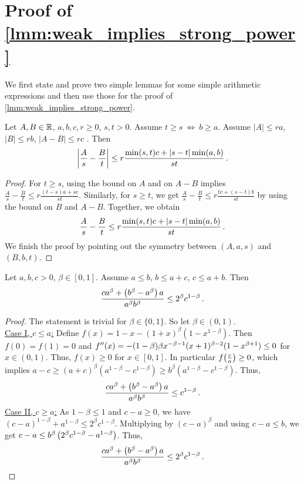 \section{Proof of \autoref{lmm:weak_implies_strong_power}} \label{app:power_metric_bound}
%
We first state and prove two simple lemmas for some simple arithmetic expressions and then use those for the proof of \autoref{lmm:weak_implies_strong_power}.
%
\begin{lemma}\label{lmm:fraction_bound}
	Let $A,B \in \mathbb{R}$, $a,b,c,r\geq 0$, $s,t>0$.
	Assume $t \geq s \ \Leftrightarrow\  b\geq a$.
	Assume $|A| \leq ra$, $|B| \leq rb$, $|A-B| \leq rc$ .
	Then
	\begin{equation*}
		\left| \frac As -\frac Bt \right| \leq  r \frac{\min(s,t)c+|s-t|\min(a,b)}{st}
		\, .
	\end{equation*}
\end{lemma}
%
\begin{proof}
	For $t \geq s$, using the bound on $A$ and on $A-B$ implies $\frac As -\frac Bt \leq  r \frac{(t-s)a+sc}{st}$. Similarly,
	for $s \geq t$, we get $\frac As -\frac Bt \leq  r \frac{tc+(s-t)b}{st}$ by using the bound on $B$ and $A-B$.
	Together, we obtain
	\begin{equation*}
		\frac As -\frac Bt \leq  r \frac{\min(s,t)c+|s-t|\min(a,b)}{st}
		\, .
	\end{equation*}
	We finish the proof by pointing out the symmetry between $(A,a,s)$ and $(B,b,t)$.
\end{proof}
%
%
\begin{lemma}\label{lmm:abc_beta_bound}
	Let $a,b,c > 0$, $\beta \in [0,1]$. Assume $a\leq b$, $b \leq a+c$, $c \leq a+b$.
	Then 
	\begin{equation*}
		\frac{c a^\beta+\left( b^\beta-a^\beta \right) a}{a^\beta b^\beta} \leq 2^{\beta} c^{1-\beta}
		\, .
	\end{equation*}
\end{lemma}
%
\begin{proof}
The statement is trivial for $\beta\in \{0,1\}$. So let $\beta\in(0,1)$.\\
\underline{Case I, $c \leq a$:}
Define $f(x) = 1-x-(1+x)^\beta(1-x^{1-\beta})$. Then $f(0)=f(1)=0$ and $f^{\prime\prime}(x) = -(1-\beta) \beta x^{-\beta - 1} (x + 1)^{\beta - 2} (1-x^{\beta + 1})\leq 0$ for $x\in(0,1)$. Thus, $f(x) \geq 0$ for $x\in[0,1]$. In particular
$f\!\left( \frac{c}{a} \right) \geq 0$, which implies $a-c \geq (a+c)^\beta(a^{1-\beta} - c^{1-\beta}) \geq b^\beta(a^{1-\beta} - c^{1-\beta})$. Thus,
\begin{equation*}
\frac{c a^\beta+\left( b^\beta-a^\beta \right) a}{a^\beta b^\beta} \leq  c^{1-\beta}\, .
\end{equation*}
\underline{Case II, $c \geq a$:}
As $1-\beta \leq 1$ and $c-a \geq 0$, we have
$(c-a)^{1-\beta} + a^{1-\beta} \leq 2^\beta c^{1-\beta}$. Multiplying by $(c-a)^\beta$ and using $c-a \leq b$, we get
$c-a \leq b^{\beta} \left( 2^\beta c^{1-\beta} - a^{1-\beta} \right)$. Thus,
\begin{align*}
\frac{c a^\beta+\left( b^\beta-a^\beta \right) a}{a^\beta b^\beta} \leq 2^{\beta} c^{1-\beta}
\, .
\end{align*}
\end{proof}
